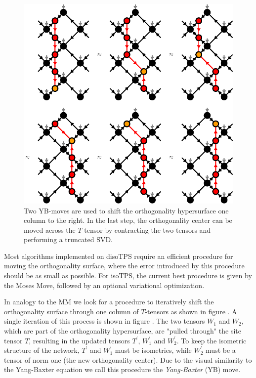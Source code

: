 \begin{figure}
	\centering
	\includegraphics[scale=1]{figures/tikz/disoTPS/shifting_ortho_surface/shifting_ortho_surface.pdf}
	\caption{Two YB-moves are used to shift the orthogonality hypersurface one column to the right. In the last step, the orthogonality center can be moved across the $T$-tensor by contracting the two tensors and performing a truncated SVD.}
	\label{fig:disoTPS_moving_ortho_surface}
\end{figure}
Most algorithms implemented on disoTPS require an efficient procedure for moving the orthogonality surface, where the error introduced by this procedure should be as small as possible. For isoTPS, the current best procedure is given by the Moses Move, followed by an optional variational optimization. \par
In analogy to the MM we look for a procedure to iteratively shift the orthogonality surface through one column of $T$-tensors as shown in figure . A single iteration of this process is shown in figure . The two tensors $W_1$ and $W_2$, which are part of the orthogonality hypersurface, are "pulled through" the site tensor $T$, resulting in the updated tensors $T^\prime$, $W_1^\prime$ and $W_2^\prime$. To keep the isometric structure of the network, $T^\prime$ and $W_1^\prime$ must be isometries, while $W_2^\prime$ must be a tensor of norm one (the new orthogonality center). Due to the visual similarity to the Yang-Baxter equation we call this procedure the \textit{Yang-Baxter} (YB) move. \par
